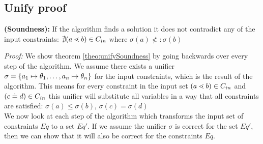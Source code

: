 
\subsection{Unify proof}

\begin{theorem}
  \label{theo:unifySoundness}
  \textbf{(Soundness):}
  If the \unify{} algorithm finds a solution it does not contradict any of the input constraints:
  $\nexists (a \lessdot b) \in C_{in}$ where $\sigma(a) \nless : \sigma(b)$
\end{theorem}

\textit{Proof:}
We show theorem \ref{theo:unifySoundness} by going backwards over every step of the algorithm.
We assume there exists a unifier $\sigma = \{ a_1 \mapsto \theta_1, \ldots , a_n \mapsto \theta_n \}$ for the input constraints,
which is the result of the \unify{} algorithm.
This means for every constraint in the input set $(a \lessdot b) \in C_{in}$ and $(c \doteq d) \in C_{in}$
this unifier will substitute all variables in a way that all constraints are satisfied:
$\sigma(a) \leq \sigma(b)$, $\sigma(c) = \sigma(d)$\\

We now look at each step of the \unify{} algorithm
which transforms the input set of constraints $Eq$ to a set $Eq'$.
If we assume the unifier $\sigma$ is correct for the set $Eq'$,
then we can show that it will also be correct for the constraints $Eq$. 

